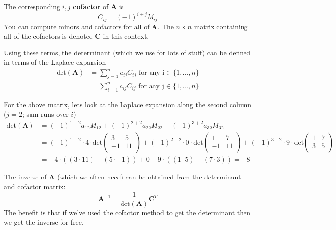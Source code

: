 \documentclass[12pt]{article}
\newcommand{\ve}[1]{\ensuremath{\mathbf{#1}}}
\begin{document}
The corresponding $i,j$ \textbf{cofactor} of $\ve{A}$ is
%
\begin{equation}
C_{ij} = (-1)^{i+j} M_{ij} \nonumber
\end{equation}
%
You can compute minors and cofactors for all of $\ve{A}$. The $n \times n$ matrix containing all of the cofactors is denoted $\ve{C}$ in this context.

Using these terms, the \underline{determinant} (which we use for lots of stuff) can be defined in terms of the Laplace expansion
%
\begin{align*}
\text{det}(\ve{A}) &= \sum_{j=1}^n a_{ij} C_{ij} \text{ for any i} \in \{1,...,n\} \\
%
&= \sum_{i=1}^n a_{ij} C_{ij} \text{ for any j} \in \{1,...,n\}
\end{align*}

For the above matrix, lets look at the Laplace expansion along the second column ($j = 2$; sum runs over $i$)
\begin{align}
\text{det}(\ve{A}) &= (-1)^{1+2} a_{12} M_{12} + (-1)^{2+2} a_{22} M_{22} + (-1)^{3+2} a_{32} M_{32} \nonumber \\
%
&= (-1)^{1+2} \cdot 4 \cdot \text{det}\begin{pmatrix}
        3 & 5 \\
        -1 & 11 \\ \end{pmatrix} + (-1)^{2+2} \cdot 0 \cdot \text{det}\begin{pmatrix} 
        1 & 7 \\
        -1 & 11 \\ \end{pmatrix} + (-1)^{3+2} \cdot 9 \cdot \text{det}\begin{pmatrix} 
        1 & 7 \\
        3 & 5 \\\end{pmatrix} \nonumber \\
%
&= -4 \cdot ((3 \cdot 11) - (5 \cdot -1)) + 0 -9 \cdot ((1 \cdot 5) - (7 \cdot 3)) = -8 \nonumber
\end{align}

The inverse of $\ve{A}$ (which we often need) can be obtained from the determinant and cofactor matrix:
%
\begin{equation}
\ve{A}^{-1} = \frac{1}{\text{det}(\ve{A})}\ve{C}^T \nonumber
\end{equation}
%
The benefit is that if we've used the cofactor method to get the determinant then we get the inverse for free. 
\end{document}
